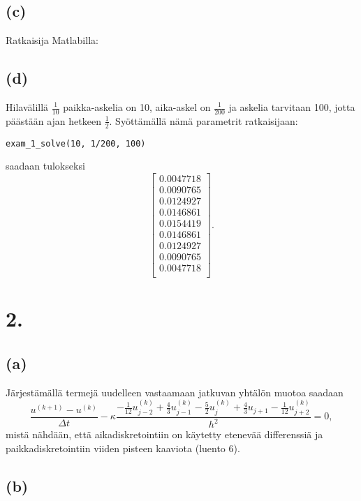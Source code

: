 \documentclass{article}
\begin{document}
\subsection*{(c)}

Ratkaisija Matlabilla:



\subsection*{(d)}

Hilavälillä $\frac{1}{10}$ paikka-askelia on 10, aika-askel on $\frac{1}{200}$
ja askelia tarvitaan 100, jotta päästään ajan hetkeen $\frac{1}{2}$.
Syöttämällä nämä parametrit ratkaisijaan:

\begin{verbatim}
exam_1_solve(10, 1/200, 100)
\end{verbatim}

saadaan tulokseksi
\[
  \begin{bmatrix}
   0.0047718 \\
   0.0090765 \\
   0.0124927 \\
   0.0146861 \\
   0.0154419 \\
   0.0146861 \\
   0.0124927 \\
   0.0090765 \\
   0.0047718 \\
  \end{bmatrix}.
\]

\newpage
\section*{2.}

\subsection*{(a)}

Järjestämällä termejä uudelleen vastaamaan jatkuvan yhtälön muotoa saadaan
\[
  \frac{u^{(k+1)} - u^{(k)}}{\Delta t}
  - \kappa \frac{-\frac{1}{12}u_{j-2}^{(k)} + \frac{4}{3}u_{j-1}^{(k)}
  - \frac{5}{2}u_j^{(k)} + \frac{4}{3}u_{j+1} - \frac{1}{12}u_{j+2}^{(k)}}{h^2} = 0,
\]
mistä nähdään, että aikadiskretointiin on käytetty etenevää differenssiä ja
paikkadiskretointiin vii\-den pisteen kaaviota (luento 6).

\subsection*{(b)}
\end{document}
